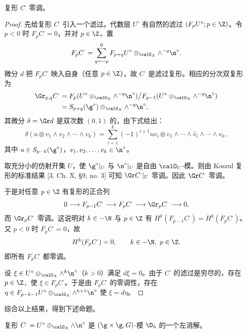\begin{lemma}\label{lem:02.2.6.2}
复形 $C^\cdot$ 零调。
\end{lemma}

\begin{proof}
先给复形 $C^\cdot$ 引入一个滤过。代数层 $U^\circ$ 有自然的滤过 $(F_pU^\circ;p\in\Z)$。令 $p<0$ 时 $F_pC^\cdot=0$，并对 $p\in\Z_+$ 置
\[
F_pC^\cdot=\sum_{q=-p}^{0}F_{p+q}U^\circ\otimes_{\calO_X}\wedge^{-q}\n^\circ .
\]
微分 $d$ 把 $F_pC^\cdot$ 映入自身（任意 $p\in\Z$），故 $C^\cdot$ 是滤过复形。相应的分次双复形为
\begin{align*}
\Gr_{p,q}C^\cdot&=F_p(U^\circ\otimes_{\calO_X}\wedge^{-q}\n^\circ)\big/F_{p-1}(U^\circ\otimes_{\calO_X}\wedge^{-q}\n^\circ)\\
&=S_{p+q}(\g^\circ)\otimes_{\calO_X}\wedge^{-q}\n^\circ,
\end{align*}
其微分 $\delta=\Gr d$ 是双次数 $(0,1)$ 的，由下式给出：
\[
\delta(u\otimes v_1\wedge v_2\wedge\cdots\wedge v_k)
=\sum_{i=1}^{k}(-1)^{i+1}uv_i\otimes v_1\wedge\cdots\wedge\hat v_i\wedge\cdots\wedge v_k,
\]
其中 $u\in S_{p-k}(\g^\circ)$，$v_1,v_2,\dots,v_k\in\n^\circ$。

取充分小的仿射开集 $U$，使 $\g^\circ|_U$ 与 $\n^\circ|_U$ 是自由 $\calO_U$-模。则由 Koszul 复形的标准结果 [3, Ch. X, §9, no. 3] 可知 $\Gr C^\cdot|_U$ 零调。因此 $\Gr C^\cdot$ 零调。

于是对任意 $p\in\Z$ 有复形的正合列
\[
0\longrightarrow F_{p-1}C^\cdot\longrightarrow F_pC^\cdot\longrightarrow\Gr_pC^\cdot\longrightarrow 0,
\]
而 $\Gr_pC^\cdot$ 零调。这说明对 $k\in-\N$ 与 $p\in\Z$ 有 $H^k(F_{p-1}C^\cdot)=H^k(F_pC^\cdot)$。又 $p<0$ 时 $F_pC^\cdot=0$，故
\[
H^k(F_pC^\cdot)=0,\qquad k\in-\N,\ p\in\Z,
\]
即所有 $F_pC^\cdot$ 都零调。

设 $\xi\in U^\circ\otimes_{\calO_X}\wedge^k\n^\circ$（$k>0$）满足 $d\xi=0$。由于 $C^\cdot$ 的滤过是穷尽的，存在 $p\in\Z_+$ 使 $\xi\in F_pC^\cdot$。于是由 $F_pC^\cdot$ 的零调性，存在 $\eta\in F_{p-k-1}U^\circ\otimes_{\calO_X}\wedge^{k+1}\n^\circ$ 使 $\xi=d\eta$。
\end{proof}

综合以上结果，得到下述命题。

\begin{proposition}\label{prop:02.2.6.3}
复形 $C^\cdot=U^\circ\otimes_{\calO_X}\wedge\n^\circ$ 是 $(\g\times\g,G)$-模 $\D_h$ 的一个左消解。
\end{proposition}

